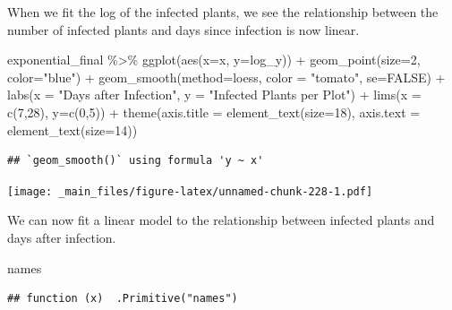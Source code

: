 \documentclass[
]{book}
\newenvironment{Shaded}{\begin{snugshade}}{\end{snugshade}}
\newcommand{\AttributeTok}[1]{\textcolor[rgb]{0.77,0.63,0.00}{#1}}
\newcommand{\ConstantTok}[1]{\textcolor[rgb]{0.00,0.00,0.00}{#1}}
\newcommand{\DecValTok}[1]{\textcolor[rgb]{0.00,0.00,0.81}{#1}}
\newcommand{\FunctionTok}[1]{\textcolor[rgb]{0.00,0.00,0.00}{#1}}
\newcommand{\NormalTok}[1]{#1}
\newcommand{\SpecialCharTok}[1]{\textcolor[rgb]{0.00,0.00,0.00}{#1}}
\newcommand{\StringTok}[1]{\textcolor[rgb]{0.31,0.60,0.02}{#1}}
\begin{document}
When we fit the log of the infected plants, we see the relationship between the number of infected plants and days since infection is now linear.

\begin{Shaded}
\begin{Highlighting}[]
\NormalTok{exponential\_final }\SpecialCharTok{\%\textgreater{}\%}
  \FunctionTok{ggplot}\NormalTok{(}\FunctionTok{aes}\NormalTok{(}\AttributeTok{x=}\NormalTok{x, }\AttributeTok{y=}\NormalTok{log\_y)) }\SpecialCharTok{+}
  \FunctionTok{geom\_point}\NormalTok{(}\AttributeTok{size=}\DecValTok{2}\NormalTok{, }\AttributeTok{color=}\StringTok{"blue"}\NormalTok{) }\SpecialCharTok{+}
  \FunctionTok{geom\_smooth}\NormalTok{(}\AttributeTok{method=}\StringTok{\textquotesingle{}loess\textquotesingle{}}\NormalTok{, }\AttributeTok{color =} \StringTok{"tomato"}\NormalTok{, }\AttributeTok{se=}\ConstantTok{FALSE}\NormalTok{) }\SpecialCharTok{+} 
  \FunctionTok{labs}\NormalTok{(}\AttributeTok{x =} \StringTok{"Days after Infection"}\NormalTok{, }\AttributeTok{y =} \StringTok{"Infected Plants per Plot"}\NormalTok{) }\SpecialCharTok{+}
  \FunctionTok{lims}\NormalTok{(}\AttributeTok{x =} \FunctionTok{c}\NormalTok{(}\DecValTok{7}\NormalTok{,}\DecValTok{28}\NormalTok{), }\AttributeTok{y=}\FunctionTok{c}\NormalTok{(}\DecValTok{0}\NormalTok{,}\DecValTok{5}\NormalTok{)) }\SpecialCharTok{+}
  \FunctionTok{theme}\NormalTok{(}\AttributeTok{axis.title =} \FunctionTok{element\_text}\NormalTok{(}\AttributeTok{size=}\DecValTok{18}\NormalTok{),}
        \AttributeTok{axis.text =} \FunctionTok{element\_text}\NormalTok{(}\AttributeTok{size=}\DecValTok{14}\NormalTok{))}
\end{Highlighting}
\end{Shaded}

\begin{verbatim}
## `geom_smooth()` using formula 'y ~ x'
\end{verbatim}

\texttt{[image: \_main\_files/figure-latex/unnamed-chunk-228-1.pdf]}

We can now fit a linear model to the relationship between infected plants and days after infection.

\begin{Shaded}
\begin{Highlighting}[]
\NormalTok{names}
\end{Highlighting}
\end{Shaded}

\begin{verbatim}
## function (x)  .Primitive("names")
\end{verbatim}
\end{document}
